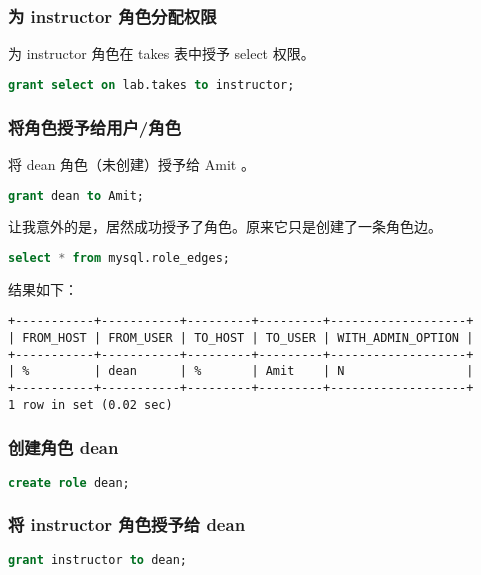 \documentclass{article}
\begin{document}
\subsubsection{为 instructor 角色分配权限}

为 instructor 角色在 takes 表中授予 select 权限。

\begin{lstlisting}[language=sql]
grant select on lab.takes to instructor;
\end{lstlisting}

\subsubsection{将角色授予给用户/角色}

将 dean 角色（未创建）授予给 Amit 。

\begin{lstlisting}[language=sql]
grant dean to Amit;
\end{lstlisting}

让我意外的是，居然成功授予了角色。原来它只是创建了一条角色边。

\begin{lstlisting}[language=sql]
select * from mysql.role_edges;
\end{lstlisting}

结果如下：

\begin{lstlisting}
+-----------+-----------+---------+---------+-------------------+
| FROM_HOST | FROM_USER | TO_HOST | TO_USER | WITH_ADMIN_OPTION |
+-----------+-----------+---------+---------+-------------------+
| %         | dean      | %       | Amit    | N                 |
+-----------+-----------+---------+---------+-------------------+
1 row in set (0.02 sec)
\end{lstlisting}

\subsubsection{创建角色 dean}

\begin{lstlisting}[language=sql]
create role dean;
\end{lstlisting}

\subsubsection{将 instructor 角色授予给 dean}

\begin{lstlisting}[language=sql]
grant instructor to dean;
\end{lstlisting}
\end{document}

